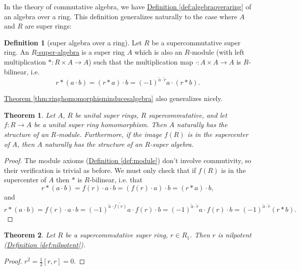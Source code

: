 \documentclass[a4paper,10pt]{scrreprt}
\newcommand{\defn}[1]{\ul{#1}}
\theoremstyle{definition}
\newtheorem{definition}{Definition}[section]
\theoremstyle{plain}
\newtheorem{theorem}{Theorem}[section]
\theoremstyle{remark}
\begin{document}
In the theory of commutative algebra, we have \hyperref[def:algebraoveraring]{Definition \ref*{def:algebraoveraring}} of an algebra over a ring. This definition generalizes naturally to the case where $A$ and $R$ are super rings:
\begin{definition}[super algebra over a ring]
  \label{def:superalgebraoveraring}
  Let $R$ be a supercommutative super ring. An \defn{$R$-super-algebra} is a super ring $A$ which is also an $R$-module (with left multiplication $*\colon R \times A \to A$) such that the multiplication map $\cdot \colon A \times A \to A$ is $R$-bilinear, i.e.
  \begin{equation*}
    r*(a\cdot b) = (r*a)\cdot b = (-1)^{\tilde{a}\cdot \tilde{r}} a\cdot (r*b).
  \end{equation*}
\end{definition}
\hyperref[thm:ringhomomorphisminducesalgebra]{Theorem \ref*{thm:ringhomomorphisminducesalgebra}} also generalizes nicely.
\begin{theorem}
  Let $A$, $R$ be unital super rings, $R$ supercommutative, and let $f\colon R \to A$ be a unital super ring homomorphism. Then $A$ naturally has the structure of an $R$-module. Furthermore, if the image $f(R)$ is in the supercenter of $A$, then $A$ naturally has the structure of an $R$-super algebra.
\end{theorem}
\begin{proof}
  The module axioms (\hyperref[def:module]{Definition \ref*{def:module}}) don't involve commutivity, so their verification is trivial as before. We must only check that if $f(R)$ is in the supercenter of $A$ then $*$ is $R$-bilinear, i.e. that
  \begin{equation*}
    r*(a\cdot b) = f(r)\cdot a\cdot b = (f(r)\cdot a)\cdot b = (r*a)\cdot b,
  \end{equation*}
  and
  \begin{equation*}
    r*(a\cdot b) = f(r)\cdot a\cdot b = (-1)^{ \tilde{a}\cdot \widetilde{f(r)}}a\cdot f(r)\cdot b = (-1)^{\tilde{a}\cdot \tilde{r}}a\cdot f(r)\cdot b = (-1)^{\tilde{a}\cdot \tilde{r}}(r*b).
  \end{equation*}
\end{proof}

\begin{theorem}
  Let $R$ be a supercommutative super ring, $r \in R_{1}$. Then $r$ is nilpotent (\hyperref[def:nilpotent]{Definition \ref*{def:nilpotent}}).
\end{theorem}
\begin{proof}
  $\displaystyle r^2 = \frac{1}{2}[r,r] = 0$.
\end{proof}
\end{document}
